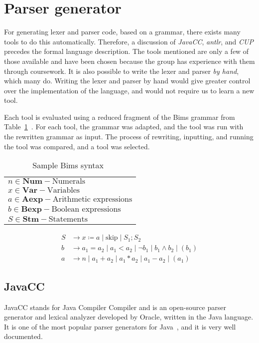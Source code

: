 \section{Parser generator}\label{sec:parsergenerator}
For generating lexer and parser code, based on a grammar, there exists many tools to do this automatically. Therefore, a discussion of \textit{JavaCC}, \textit{\gls{antlr}}, and \textit{CUP} precedes the formal language description. The tools mentioned are only a few of those available and have been chosen because the group has experience with them through coursework. It is also possible to write the lexer and parser \textit{by hand}, which many do. Writing the lexer and parser by hand would give greater control over the implementation of the language, and would not require us to learn a new tool.

Each tool is evaluated using a reduced fragment of the Bims grammar from Table~\ref{tab:bimsgrammar}~\cite{Huttel2010}. For each tool, the grammar was adapted, and the tool was run with the rewritten grammar as input. The process of rewriting, inputting, and running the tool was compared, and a tool was selected.


\begin{table}[htb!]
  \centering
  \begin{tabular}{l}
    $n \in \textbf{Num} - \text{Numerals}$                \\
    $x \in \textbf{Var} - \text{Variables}$               \\
    $a \in \textbf{Aexp} - \text{Arithmetic expressions}$ \\
    $b \in \textbf{Bexp} - \text{Boolean expressions}$    \\
    $S \in \textbf{Stm} - \text{Statements}$              \\
  \end{tabular}
  \begin{align*}
    S & \rightarrow x \coloneqq a \mid \text{skip} \mid S_1;S_2                          \\
    b & \rightarrow a_1 = a_2 \mid a_1 < a_2 \mid \neg b_1 \mid b_1 \land b_2 \mid (b_1) \\
    a & \rightarrow n \mid a_1 + a_2 \mid a_1 * a_2 \mid a_1 - a_2 \mid (a_1)
  \end{align*}
  \caption{Sample Bims syntax~\cite{Huttel2010}}
  \label{tab:bimsgrammar}
\end{table}


\subsection{JavaCC}
JavaCC stands for Java Compiler Compiler and is an open-source parser generator and lexical analyzer developed by Oracle, written in the Java language. It is one of the most popular parser generators for Java~\cite{JavaCC2021}, and it is very well documented.

